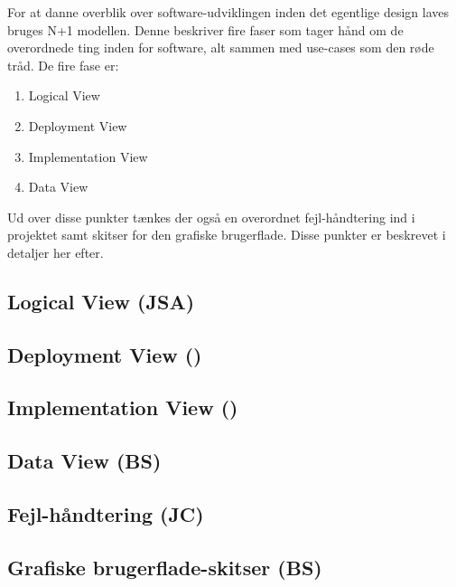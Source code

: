 For at danne overblik over software-udviklingen inden det egentlige design laves bruges N+1 modellen.
Denne beskriver fire faser som tager hånd om de overordnede ting inden for software, alt sammen med use-cases som den røde tråd.
De fire fase er:
\begin{enumerate}
	\item Logical View
	\item Deployment View
	\item Implementation View
	\item Data View
\end{enumerate}

Ud over disse punkter tænkes der også en overordnet fejl-håndtering ind i projektet samt skitser for den grafiske brugerflade. Disse punkter er beskrevet i detaljer her efter.

\subsection{Logical View (JSA)}


\subsection{Deployment View ()}


\subsection{Implementation View ()}


\subsection{Data View (BS)}


\subsection{Fejl-håndtering (JC)}


\subsection{Grafiske brugerflade-skitser (BS)}
\label{subsec:GUI}
